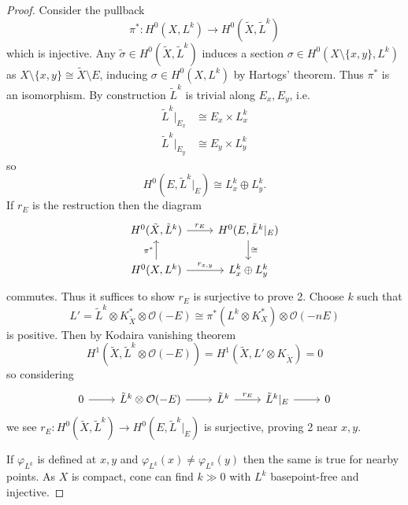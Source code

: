 \documentclass[a4paper]{article}
\begin{document}
\begin{proof}
  Consider the pullback
  \[
    \pi^*: H^0(X, L^k) \to H^0(\tilde X, \tilde L^k)
  \]
  which is injective. Any \(\tilde \sigma \in H^0(\tilde X, \tilde L^k)\) induces a section \(\sigma \in H^0(X \setminus \{x, y\}, L^k)\) as \(X \setminus \{x, y\} \cong \tilde X \setminus E\), inducing \(\sigma \in H^0(X, L^k)\) by Hartogs' theorem. Thus \(\pi^*\) is an isomorphism. By construction \(\tilde L^k\) is trivial along \(E_x, E_y\), i.e.\
  \begin{align*}
    \tilde L^k|_{E_x} &\cong E_x \times L^k_x \\
    \tilde L^k|_{E_y} &\cong E_y \times L^k_y
  \end{align*}
  so
  \[
    H^0(E, \tilde L^k|_E) \cong L^k_x \oplus L^k_y.
  \]
  If \(r_E\) is the restruction then the diagram
  \[
    \begin{tikzcd}
      H^0(\tilde X, \tilde L^k) \ar[r, "r_E"] & H^0(E, \tilde L^k|_E) \ar[d, "\cong"] \\
      H^0(X, L^k) \ar[u, "\pi^*"] \ar[r, "r_{x, y}"] & L_x^k \oplus L_y^k
    \end{tikzcd}
  \]
  commutes. Thus it suffices to show \(r_E\) is surjective to prove 2. Choose \(k\) such that
  \[
    L'
    = \tilde L^k \otimes K_{\tilde X}^* \otimes \mathcal O(-E)
    \cong \pi^*(L^k \otimes K_X^*) \otimes \mathcal O(-nE)
  \]
  is positive. Then by Kodaira vanishing theorem
  \[
    H^1(\tilde X, \tilde L^k \otimes \mathcal O(-E)) = H^1(\tilde X, L' \otimes K_{\tilde X}) = 0
  \]
  so considering
  \[
    \begin{tikzcd}
      0 \ar[r] & \tilde L^k \otimes \mathcal O(-E) \ar[r] & \tilde L^k \ar[r, "r_E"] & \tilde L^k|_E \ar[r] & 0
    \end{tikzcd}
  \]
  we see \(r_E: H^0(\tilde X, \tilde L^k) \to H^0(E, \tilde L^k|_E)\) is surjective, proving 2 near \(x, y\).

  If \(\varphi_{L^k}\) is defined at \(x, y\) and \(\varphi_{L^k}(x) \neq \varphi_{L^k}(y)\) then the same is true for nearby points. As \(X\) is compact, cone can find \(k \gg 0\) with \(L^k\) basepoint-free and injective.


\end{proof}
\end{document}
